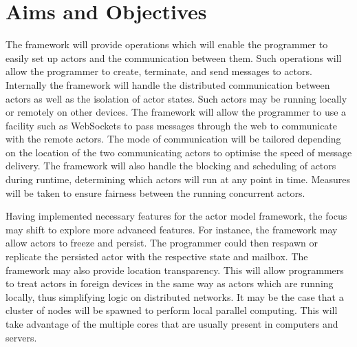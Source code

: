 \documentclass[12pt]{report}
\begin{document}
\section{Aims and Objectives}
The framework will provide operations which will enable the programmer to easily set up actors and the communication between them. Such operations will allow the programmer to create, terminate, and send messages to actors. Internally the framework will handle the distributed communication between actors as well as the isolation of actor states. Such actors may be running locally or remotely on other devices. The framework will allow the programmer to use a facility such as WebSockets to pass messages through the web to communicate with the remote actors. The mode of communication will be tailored depending on the location of the two communicating actors to optimise the speed of message delivery. The framework will also handle the blocking and scheduling of actors during runtime, determining which actors will run at any point in time. Measures will be taken to ensure fairness between the running concurrent actors.

Having implemented necessary features for the actor model framework, the focus may shift to explore more advanced features. For instance, the framework may allow actors to freeze and persist. The programmer could then respawn or replicate the persisted actor with the respective state and mailbox. The framework may also provide location transparency. This will allow programmers to treat actors in foreign devices in the same way as actors which are running locally, thus simplifying logic on distributed networks. It may be the case that a cluster of nodes will be spawned to perform local parallel computing. This will take advantage of the multiple cores that are usually present in computers and servers.
\newpage
\end{document}
